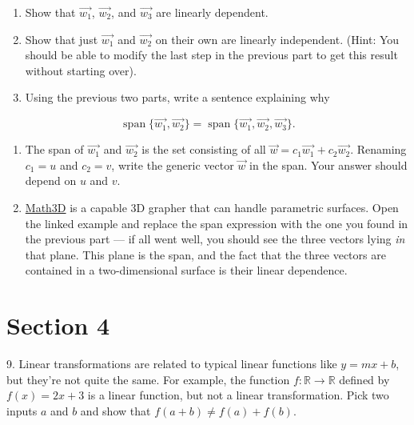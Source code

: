 \documentclass{article}
\begin{document}
\begin{enumerate}

	\item Show that $\vec{w_1}$, $\vec{w_2}$, and $\vec{w_3}$ are linearly dependent.

	\item Show that just $\vec{w_1}$ and $\vec{w_2}$ on their own are linearly independent. (Hint: You should be able to modify the last step in the previous part to get this result without starting over).

	\item Using the previous two parts, write a sentence explaining why

\end{enumerate}

$$
	\operatorname{span}\{\vec{w_1}, \vec{w_2}\} = \operatorname{span}\{\vec{w_1}, \vec{w_2}, \vec{w_3}\}.
$$

\begin{enumerate}

	\item The span of $\vec{w_1}$ and $\vec{w_2}$ is the set consisting of all $\vec{w} = c_1\vec{w_1} + c_2\vec{w_2}$. Renaming $c_1 = u$ and $c_2 = v$, write the generic vector $\vec{w}$ in the span. Your answer should depend on $u$ and $v$.

	\item \href{https://www.math3d.org/8Adpukc7b}{Math3D} is a capable 3D grapher that can handle parametric surfaces. Open the linked example and replace the span expression with the one you found in the previous part --- if all went well, you should see the three vectors lying \textit{in} that plane. This plane is the span, and the fact that the three vectors are contained in a two-dimensional surface is their linear dependence.

\end{enumerate}

\section{Section 4}

9. Linear transformations are related to typical linear functions like $y = mx + b$, but they're not quite the same. For example, the function $f : \mathbb{R} \to \mathbb{R}$ defined by $f(x) = 2x + 3$ is a linear function, but not a linear transformation. Pick two inputs $a$ and $b$ and show that $f(a + b) \neq f(a) + f(b)$.

~\\
\end{document}
